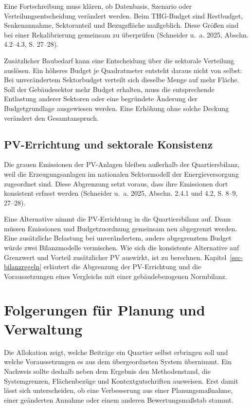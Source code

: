 \documentclass[
  ngerman,
  a4paper,
  DIV=11]{scrreprt}
\begin{document}
Eine Fortschreibung muss klären, ob Datenbasis, Szenario oder
Verteilungsentscheidung verändert werden. Beim THG-Budget sind
Restbudget, Senkenannahme, Sektoranteil und Bezugsfläche maßgeblich.
Diese Größen sind bei einer Rekalibrierung gemeinsam zu überprüfen
(Schneider u.~a. 2025, Abschn. 4.2--4.3, S. 27--28).

Zusätzlicher Baubedarf kann eine Entscheidung über die sektorale
Verteilung auslösen. Ein höheres Budget je Quadratmeter entsteht daraus
nicht von selbst: Bei unverändertem Sektorbudget verteilt sich dieselbe
Menge auf mehr Fläche. Soll der Gebäudesektor mehr Budget erhalten, muss
die entsprechende Entlastung anderer Sektoren oder eine begründete
Änderung der Budgetgrundlage ausgewiesen werden. Eine Erhöhung ohne
solche Deckung verändert den Gesamtanspruch.

\subsection{PV-Errichtung und sektorale
Konsistenz}\label{pv-errichtung-und-sektorale-konsistenz}

Die grauen Emissionen der PV-Anlagen bleiben außerhalb der
Quartiersbilanz, weil die Erzeugungsanlagen im nationalen Sektormodell
der Energieversorgung zugeordnet sind. Diese Abgrenzung setzt voraus,
dass ihre Emissionen dort konsistent erfasst werden (Schneider u.~a.
2025, Abschn. 2.4.1 und 4.2, S. 8--9, 27--28).

Eine Alternative nimmt die PV-Errichtung in die Quartiersbilanz auf.
Dann müssen Emissionen und Budgetzuordnung gemeinsam neu abgegrenzt
werden. Eine zusätzliche Belastung bei unverändertem, anders
abgegrenztem Budget würde zwei Bilanzmodelle vermischen. Wie sich die
konsistente Alternative auf Grenzwert und Vorteil zusätzlicher PV
auswirkt, ist zu berechnen. Kapitel~\ref{sec-bilanzregeln} erläutert die
Abgrenzung der PV-Errichtung und die Voraussetzungen eines Vergleichs
mit einer gebäudebezogenen Normbilanz.

\section{Folgerungen für Planung und
Verwaltung}\label{folgerungen-fuxfcr-planung-und-verwaltung}

Die Allokation zeigt, welche Beiträge ein Quartier selbst erbringen soll
und welche Voraussetzungen es aus dem übergeordneten System übernimmt.
Ein Nachweis sollte deshalb neben dem Ergebnis den Methodenstand, die
Systemgrenzen, Flächenbezüge und Kontextgutschriften ausweisen. Erst
damit lässt sich unterscheiden, ob eine Verbesserung aus einer
Planungsmaßnahme, einer geänderten Annahme oder einem anderen
Bewertungsmaßstab stammt.
\end{document}
